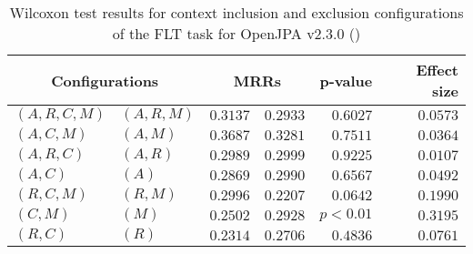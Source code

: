 
\begin{table}
\begin{spacing}{1.2}
\centering
\caption{Wilcoxon test results for context inclusion and exclusion configurations of the FLT task for OpenJPA v2.3.0 (\ctwo)}
\label{table:versus-wilcox-openjpa-flt-context}
\begin{tabular}{ll|rr|rr}
\toprule
      \multicolumn{2}{c|}{Configurations} &                \multicolumn{2}{c|}{MRRs} &             p-value & Effect size \\
\midrule
 $(A,R,C,M)$ &  $(A,R,M)$ &  $\bm{0.3137}$ &       $0.2933$ & $0.6027$ &    $0.0573$ \\
   $(A,C,M)$ &    $(A,M)$ &  $\bm{0.3687}$ &       $0.3281$ & $0.7511$ &    $0.0364$ \\
   $(A,R,C)$ &    $(A,R)$ &       $0.2989$ &  $\bm{0.2999}$ & $0.9225$ &    $0.0107$ \\
     $(A,C)$ &      $(A)$ &       $0.2869$ &  $\bm{0.2990}$ & $0.6567$ &    $0.0492$ \\
   $(R,C,M)$ &    $(R,M)$ &  $\bm{0.2996}$ &       $0.2207$ & $0.0642$ &    $0.1990$ \\
     $(C,M)$ &      $(M)$ &       $0.2502$ &  $\bm{0.2928}$ & $p<0.01$ &    $0.3195$ \\
     $(R,C)$ &      $(R)$ &       $0.2314$ &  $\bm{0.2706}$ & $0.4836$ &    $0.0761$ \\
\bottomrule
\end{tabular}

\end{spacing}
\end{table}

